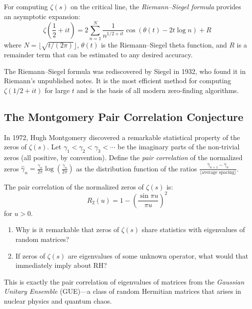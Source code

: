 For computing $\zeta(s)$ on the critical line, the \textit{Riemann--Siegel formula} provides an asymptotic expansion:
\[
\zeta\left(\frac{1}{2} + it\right) = 2 \sum_{n=1}^{N} \frac{1}{n^{1/2 + it}} \cos(\theta(t) - 2t \log n) + R
\]
where $N = \lfloor \sqrt{t/(2\pi)} \rfloor$, $\theta(t)$ is the Riemann--Siegel theta function, and $R$ is a remainder term that can be estimated to any desired accuracy.

The Riemann--Siegel formula was rediscovered by Siegel in 1932, who found it in Riemann's unpublished notes. It is the most efficient method for computing $\zeta(1/2 + it)$ for large $t$ and is the basis of all modern zero-finding algorithms.

\subsection{The Montgomery Pair Correlation Conjecture}
\label{sec:montgomery}

In 1972, Hugh Montgomery discovered a remarkable statistical property of the zeros of $\zeta(s)$. Let $\gamma_1 < \gamma_2 < \gamma_3 < \cdots$ be the imaginary parts of the non-trivial zeros (all positive, by convention). Define the \textit{pair correlation} of the normalized zeros $\hat{\gamma}_n = \frac{\gamma_n}{2\pi} \log\left(\frac{\gamma_n}{2\pi}\right)$ as the distribution function of the ratios $\frac{\hat{\gamma}_{n+1} - \hat{\gamma}_n}{\langle \text{average spacing}\rangle}$.

\begin{conjecture}[Montgomery, 1973]
\label{conj:montgomery}
The pair correlation of the normalized zeros of $\zeta(s)$ is:
\[
R_2(u) = 1 - \left(\frac{\sin \pi u}{\pi u}\right)^2
\]
for $u > 0$.
\end{conjecture}

\begin{checkyou}
\begin{enumerate}
  \item Why is it remarkable that zeros of $\zeta(s)$ share statistics with eigenvalues of random matrices?
  \item If zeros of $\zeta(s)$ are eigenvalues of some unknown operator, what would that immediately imply about RH?
\end{enumerate}
\end{checkyou}

This is exactly the pair correlation of eigenvalues of matrices from the \textit{Gaussian Unitary Ensemble} (GUE)---a class of random Hermitian matrices that arises in nuclear physics and quantum chaos.

